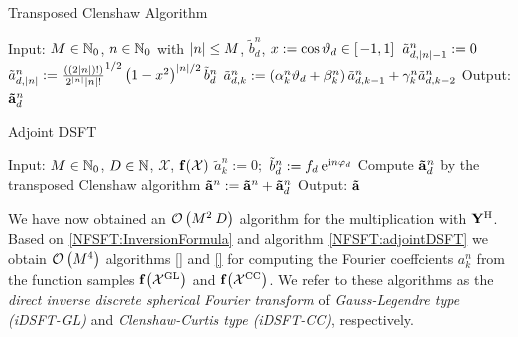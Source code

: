 \begin{algorithm}[htb]
  \caption{Transposed Clenshaw Algorithm}
  \label{NFSFT:transposedClenshaw}    
  \begin{algorithmic}
    \STATE  Input: $M \in \mathbb{N}_{0}$, $n \in \mathbb{N}_{0}$ with $\left\vert n\right\vert \le M$, $\tilde{b}^n_{d}$, $x := \cos\vartheta_{d} \in \left[\left.-1,1\right]\right.$
    \STATE
    \STATE $\tilde{a}_{d,\left\vert n\right\vert-1}^n := 0$
    \STATE $\tilde{a}_{d,\left\vert n\right\vert}^n := \frac{((2|n|)!)}{2^{|n|} |n|!}^{1/2} \left(1-x^2\right)^{|n|/2} \tilde{b}^n_{d}$
      \STATE $\tilde{a}_{d,k}^n := \left(\alpha_{k}^n\vartheta_{d} + \beta_{k}^n\right)\tilde{a}_{d,k-1}^n + \gamma_{k}^n \tilde{a}_{d,k-2}^n$
    \ENDFOR
    \STATE
    \STATE Output: $\mathbf{\tilde{a}}^n_{d}$
\end{algorithmic}
\end{algorithm}
\begin{algorithm}[htb]
  \caption{Adjoint DSFT}
  \label{NFSFT:adjointDSFT}    
  \begin{algorithmic}
    \STATE  Input: $M \in \mathbb{N}_{0}$, $D \in \mathbb{N}$, $\mathcal{X}$, $\mathbf{f}{\hspace{-0.4ex}}\left(\mathcal{X}\right)$
    \STATE
        \STATE $\tilde{a}_{k}^n := 0;$
      \ENDFOR
    \ENDFOR
        \STATE $\tilde{b}^n_{d} := f_{d} \: \mbox{\rm{e}}^{\mbox{\scriptsize\rm{i}} n \varphi_{d}}$
        \STATE Compute $\mathbf{\tilde{a}}^n_{d}$ by the transposed Clenshaw algorithm
        \STATE $\mathbf{\tilde{a}}^n := \mathbf{\tilde{a}}^n + \mathbf{\tilde{a}}^n_{d}$
      \ENDFOR
    \ENDFOR
    \STATE
    \STATE Output: $\mathbf{\tilde{a}}$
\end{algorithmic}
\end{algorithm}

We have now obtained an $\mathcal{O}\left(M^2\:D\right)$ algorithm for the multiplication with $\mathbf{Y}^{\text{\rm{H}}}$. Based on \ref{NFSFT:InversionFormula} and algorithm \ref{NFSFT:adjointDSFT} we obtain $\mathcal{O}\left(M^4\right)$ algorithms \ref{} and \ref{} for computing the Fourier coeffcients $a_{k}^n$ from the function samples $\mathbf{f}{\hspace{-0.4ex}}\left(\mathcal{X}^{\mbox{\scriptsize\rm{GL}}}\right)$ and $\mathbf{f}{\hspace{-0.4ex}}\left(\mathcal{X}^{\mbox{\scriptsize\rm{CC}}}\right)$. We refer to these algorithms as the \emph{direct inverse discrete spherical Fourier transform} of \emph{Gauss-Legendre type (iDSFT-GL)} and \emph{Clenshaw-Curtis type (iDSFT-CC)}, respectively.

